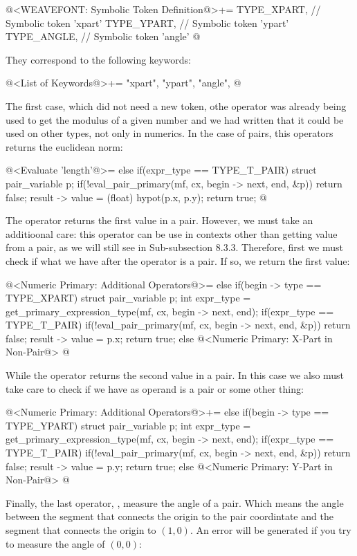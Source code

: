 \iniciocodigo
@<WEAVEFONT: Symbolic Token Definition@>+=
TYPE_XPART,  // Symbolic token 'xpart'
TYPE_YPART,  // Symbolic token 'ypart'
TYPE_ANGLE,  // Symbolic token 'angle'
@
\fimcodigo

They correspond to the following keywords:

\iniciocodigo
@<List of Keywords@>+=
"xpart", "ypart", "angle",
@
\fimcodigo

The first case, which did not need a new token, othe
operator  was already being used to get the modulus
of a given number and we had written that it could be used on other
types, not only in numerics. In the case of pairs, this operators
returns the euclidean norm:

\iniciocodigo
@<Evaluate 'length'@>=
else if(expr_type == TYPE_T_PAIR){
  struct pair_variable p;
  if(!eval_pair_primary(mf, cx, begin -> next, end, &p))
    return false;
  result -> value = (float) hypot(p.x, p.y);
  return true;
}
@
\fimcodigo

The operator  returns the first value in a
pair. However, we must take an additioonal care: this operator can be
use in contexts other than getting value from a pair, as we will still
see in Sub-subsection 8.3.3. Therefore, first we must check if what we
have after the operator is a pair. If so, we return the first value:

\iniciocodigo
@<Numeric Primary: Additional Operators@>=
else if(begin -> type == TYPE_XPART){
  struct pair_variable p;
  int expr_type = get_primary_expression_type(mf, cx, begin -> next, end);
  if(expr_type == TYPE_T_PAIR){
    if(!eval_pair_primary(mf, cx, begin -> next, end, &p))
      return false;
    result -> value = p.x;
    return true;
  }
  else{
    @<Numeric Primary: X-Part in Non-Pair@>
  }
}
@
\fimcodigo

While the operator  returns the second value in a
pair. In this case we also must take care to check if we have as
operand is a pair or some other thing:

\iniciocodigo
@<Numeric Primary: Additional Operators@>+=
else if(begin -> type == TYPE_YPART){
  struct pair_variable p;
  int expr_type = get_primary_expression_type(mf, cx, begin -> next, end);
  if(expr_type == TYPE_T_PAIR){
    if(!eval_pair_primary(mf, cx, begin -> next, end, &p))
      return false;
    result -> value = p.y;
    return true;
  }
  else{
    @<Numeric Primary: Y-Part in Non-Pair@>
  }
}
@
\fimcodigo

Finally, the last operator, , measure the angle of a
pair. Which means the angle between the segment that connects the
origin to the pair coordintate and the segment that connects the
origin to $(1,0)$. An error will be generated if you try to measure
the angle of $(0,0)$:


